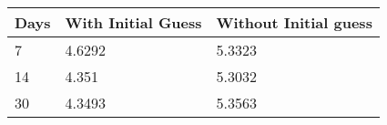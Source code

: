 \begin{tabular}{lll}
Days & With Initial Guess & Without Initial guess \\ 
\hline 
7 & 4.6292 & 5.3323 \\ 
14 & 4.351 & 5.3032 \\ 
30 & 4.3493 & 5.3563 \\ 
\hline 
\end{tabular}